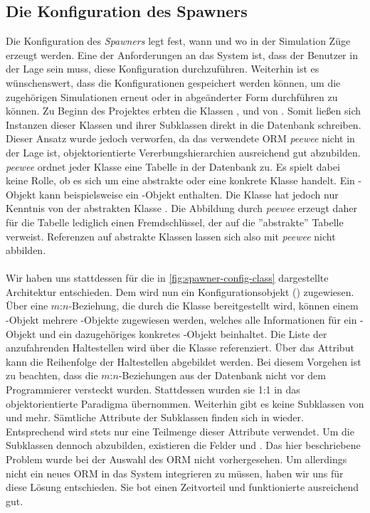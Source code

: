 \subsection{Die Konfiguration des Spawners}

Die Konfiguration des \emph{Spawners} legt fest, wann und wo in der Simulation Züge erzeugt werden. Eine der Anforderungen an das System ist, dass der Benutzer in der Lage sein muss, diese Konfiguration durchzuführen. Weiterhin ist es wünschenswert, dass die Konfigurationen gespeichert werden können, um die zugehörigen Simulationen erneut oder in abgeänderter Form durchführen zu können. Zu Beginn des Projektes erbten die Klassen ,  und  von . Somit ließen sich Instanzen dieser Klassen und ihrer Subklassen direkt in die Datenbank schreiben. Dieser Ansatz wurde jedoch verworfen, da das verwendete ORM \emph{peewee} nicht in der Lage ist, objektorientierte Vererbungshierarchien ausreichend gut abzubilden. \emph{peewee} ordnet jeder Klasse eine Tabelle in der Datenbank zu. Es spielt dabei keine Rolle, ob es sich um eine abstrakte oder eine konkrete Klasse handelt. Ein -Objekt kann beispielsweise ein -Objekt enthalten. Die Klasse  hat jedoch nur Kenntnis von der abstrakten Klasse . Die Abbildung durch \emph{peewee} erzeugt daher für die Tabelle  lediglich einen Fremdschlüssel, der auf die ''abstrakte'' Tabelle  verweist. Referenzen auf abstrakte Klassen lassen sich also mit \emph{peewee} nicht abbilden.\\
\\
Wir haben uns stattdessen für die in \autoref{fig:spawner-config-class} dargestellte Architektur entschieden. Dem  wird nun ein Konfigurationsobjekt () zugewiesen. Über eine $m$:$n$-Beziehung, die durch die Klasse  bereitgestellt wird, können einem -Objekt mehrere -Objekte zugewiesen werden, welches alle Informationen für ein -Objekt und ein dazugehöriges konkretes -Objekt beinhaltet. Die Liste der anzufahrenden Haltestellen wird über die Klasse  referenziert. Über das Attribut  kann die Reihenfolge der Haltestellen abgebildet werden. Bei diesem Vorgehen ist zu beachten, dass die $m$:$n$-Beziehungen aus der Datenbank nicht vor dem Programmierer versteckt wurden. Stattdessen wurden sie 1:1 in das objektorientierte Paradigma übernommen. Weiterhin gibt es keine Subklassen von  und  mehr. Sämtliche Attribute der Subklassen finden sich in  wieder. Entsprechend wird stets nur eine Teilmenge dieser Attribute verwendet. Um die Subklassen dennoch abzubilden, existieren die Felder  und . Das hier beschriebene Problem wurde bei der Auswahl des ORM nicht vorhergesehen. Um allerdings nicht ein neues ORM in das System integrieren zu müssen, haben wir uns für diese Lösung entschieden. Sie bot einen Zeitvorteil und funktionierte ausreichend gut.

